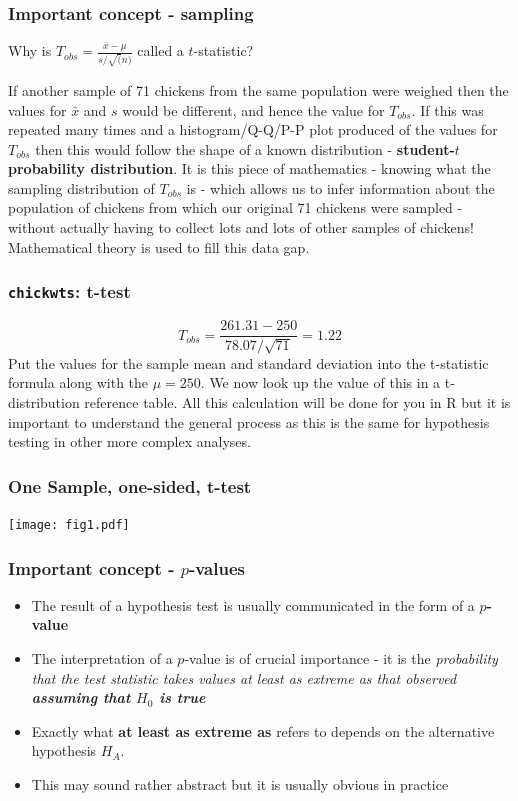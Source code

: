\documentclass{beamer}\usepackage[]{graphicx}\usepackage[]{color}
\begin{document}
{{{\begin{frame}
\frametitle{Important concept - sampling }
\begin{center}
Why is $T_{obs}=\frac{\bar{x}-\mu}{s/\sqrt(n)}$ called a $t$-statistic?
\end{center}
\vspace{0.2cm}
If another sample of 71 chickens from the same population were weighed then the
values for $\bar{x}$ and $s$ would be different, and hence the value for $T_{obs}$.
If this was repeated many times and a histogram/Q-Q/P-P plot produced of the
values for $T_{obs}$ then this would follow the shape of a known distribution
- {\bfseries student-$t$ probability distribution}. It is this piece of
mathematics - knowing what the sampling distribution of $T_{obs}$ is -
which allows us to infer information about the population of chickens from
which our original 71 chickens were sampled - without actually having to
collect lots and lots of other samples of chickens! Mathematical theory is
used to fill this data gap.
\end{frame}


\begin{frame}
\frametitle{\texttt{chickwts}: t-test}
\begin{equation}
T_{obs}=\frac{261.31-250}{78.07/\sqrt{71}}=1.22 \nonumber
\end{equation}
Put the values for the sample mean and standard deviation into the t-statistic
formula along with the $\mu=250$. We now look up the value of this in a
t-distribution reference table. All this calculation will be done for you in
R but it is important to understand the general process as this is the same
for hypothesis testing in other more complex analyses.
\end{frame}


\begin{frame}\frametitle{One Sample, one-sided, t-test}
\texttt{[image: fig1.pdf]}
\end{frame}


\begin{frame}
\frametitle{Important concept - $p$-values}
\begin{itemize}
\item The result of a hypothesis test is usually communicated in the form of a
{\bfseries $p$-value}
\item The interpretation of a $p$-value is of crucial importance - it is the
\emph{probability that the test statistic takes values at least as extreme
as that observed {\bfseries assuming that $H_0$ is true}}
\item Exactly what {\bfseries at least as extreme as} refers to depends on
the alternative hypothesis $H_A$.
\item This may sound rather abstract but it is usually obvious in practice
\end{itemize}
\end{frame}

}}}
\end{document}
